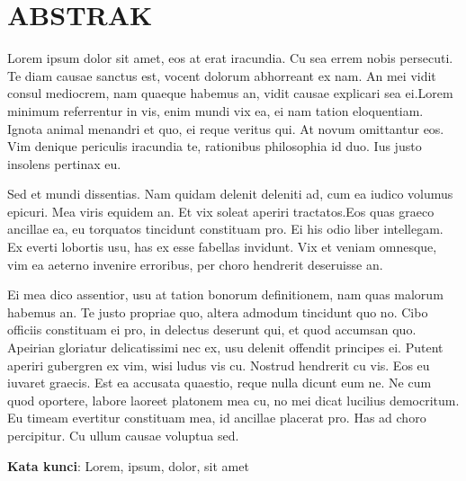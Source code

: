 \chapter{ABSTRAK}
\vspace{0.05cm}

Lorem ipsum dolor sit amet, eos at erat iracundia. Cu sea errem nobis persecuti. Te diam causae sanctus est, vocent dolorum abhorreant ex nam. An mei vidit consul mediocrem, nam quaeque habemus an, vidit causae explicari sea ei.Lorem minimum referrentur in vis, enim mundi vix ea, ei nam tation eloquentiam. Ignota animal menandri et quo, ei reque veritus qui. At novum omittantur eos. Vim denique periculis iracundia te, rationibus philosophia id duo. Ius justo insolens pertinax eu. \par

Sed et mundi dissentias. Nam quidam delenit deleniti ad, cum ea iudico volumus epicuri. Mea viris equidem an. Et vix soleat aperiri tractatos.Eos quas graeco ancillae ea, eu torquatos tincidunt constituam pro. Ei his odio liber intellegam. Ex everti lobortis usu, has ex esse fabellas invidunt. Vix et veniam omnesque, vim ea aeterno invenire erroribus, per choro hendrerit deseruisse an. \par 

Ei mea dico assentior, usu at tation bonorum definitionem, nam quas malorum habemus an. Te justo propriae quo, altera admodum tincidunt quo no. Cibo officiis constituam ei pro, in delectus deserunt qui, et quod accumsan quo. Apeirian gloriatur delicatissimi nec ex, usu delenit offendit principes ei. Putent aperiri gubergren ex vim, wisi ludus vis cu. Nostrud hendrerit cu vis. Eos eu iuvaret graecis. Est ea accusata quaestio, reque nulla dicunt eum ne. Ne cum quod oportere, labore laoreet platonem mea cu, no mei dicat lucilius democritum. Eu timeam evertitur constituam mea, id ancillae placerat pro. Has ad choro percipitur. Cu ullum causae voluptua sed.\par
\vspace{0.05cm}
\textbf{Kata kunci}: Lorem, ipsum, dolor, sit amet